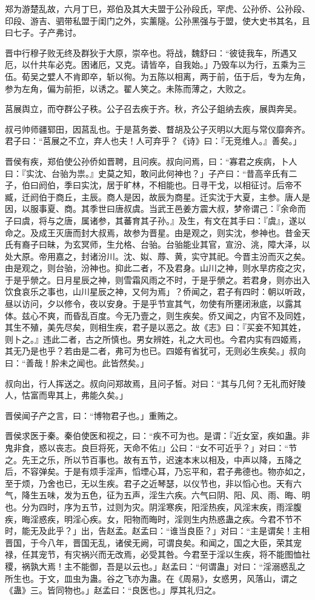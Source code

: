 \documentclass[]{article}
\begin{document}
郑为游楚乱故，六月丁巳，郑伯及其大夫盟于公孙段氏，罕虎、公孙侨、公孙段、印段、游吉、驷带私盟于闺门之外，实薰隧。公孙黑强与于盟，使大史书其名，且曰七子。子产弗讨。

晋中行穆子败无终及群狄于大原，崇卒也。将战，魏舒曰：``彼徒我车，所遇又厄，以什共车必克。困诸厄，又克。请皆卒，自我始。」乃毁车以为行，五乘为三伍。荀吴之嬖人不肯即卒，斩以徇。为五陈以相离，两于前，伍于后，专为左角，参为左角，偏为前拒，以诱之。翟人笑之。未陈而薄之，大败之。

莒展舆立，而夺群公子秩。公子召去疾于齐。秋，齐公子鉏纳去疾，展舆奔吴。

叔弓帅师疆郓田，因莒乱也。于是莒务娄、瞀胡及公子灭明以大厖与常仪靡奔齐。君子曰：``莒展之不立，弃人也夫！人可弃乎？《诗》曰：『无竞维人。』善矣。」

晋侯有疾，郑伯使公孙侨如晋聘，且问疾。叔向问焉，曰：``寡君之疾病，卜人曰：『实沈、台骀为祟。』史莫之知，敢问此何神也？」子产曰：``昔高辛氏有二子，伯曰阏伯，季曰实沈，居于旷林，不相能也。日寻干戈，以相征讨。后帝不臧，迁阏伯于商丘，主辰。商人是因，故辰为商星。迁实沈于大夏，主参。唐人是因，以服事夏、商。其季世曰唐叔虞。当武王邑姜方震大叔，梦帝谓己：『余命而子曰虞，将与之唐，属诸参，其蕃育其子孙。』及生，有文在其手曰：『虞』，遂以命之。及成王灭唐而封大叔焉，故参为晋星。由是观之，则实沈，参神也。昔金天氏有裔子曰昧，为玄冥师，生允格、台骀。台骀能业其官，宣汾、洮，障大泽，以处大原。帝用嘉之，封诸汾川。沈、姒、蓐、黄，实守其祀。今晋主汾而灭之矣。由是观之，则台骀，汾神也。抑此二者，不及君身。山川之神，则水旱疠疫之灾，于是乎禜之。日月星辰之神，则雪霜风雨之不时，于是乎禜之。若君身，则亦出入饮食哀乐之事也，山川星辰之神，又何为焉」？侨闻之，君子有四时：朝以听政，昼以访问，夕以修令，夜以安身。于是乎节宣其气，勿使有所壅闭湫底，以露其体。兹心不爽，而昏乱百度。今无乃壹之，则生疾矣。侨又闻之，内官不及同姓，其生不殖，美先尽矣，则相生疾，君子是以恶之。故《志》曰：『买妾不知其姓，则卜之。』违此二者，古之所慎也。男女辨姓，礼之大司也。今君内实有四姬焉，其无乃是也乎？若由是二者，弗可为也已。四姬有省犹可，无则必生疾矣。」叔向曰：``善哉！肸未之闻也。此皆然矣。」

叔向出，行人挥送之。叔向问郑故焉，且问子皙。对曰：``其与几何？无礼而好陵人，怙富而卑其上，弗能久矣。」

晋侯闻子产之言，曰：``博物君子也。」重贿之。

晋侯求医于秦。秦伯使医和视之，曰：``疾不可为也。是谓：『近女室，疾如蛊。非鬼非食，惑以丧志。良巨将死，天命不佑』」公曰：``女不可近乎？」对曰：``节之。先王之乐，所以节百事也。故有五节，迟速本末以相及，中声以降，五降之后，不容弹矣。于是有烦手淫声，慆堙心耳，乃忘平和，君子弗德也。物亦如之，至于烦，乃舍也已，无以生疾。君子之近琴瑟，以仪节也，非以慆心也。天有六气，降生五味，发为五色，征为五声，淫生六疾。六气曰阴、阳、风、雨、晦、明也。分为四时，序为五节，过则为灾。阴淫寒疾，阳淫热疾，风淫末疾，雨淫腹疾，晦淫惑疾，明淫心疾。女，阳物而晦时，淫则生内热惑蛊之疾。今君不节不时，能无及此乎？」出，告赵孟。赵孟曰：``谁当良臣？」对曰：``主是谓矣！主相晋国，于今八年，晋国无乱，诸侯无阙，可谓良矣。和闻之，国之大臣，荣其宠禄，任其宠节，有灾祸兴而无改焉，必受其咎。今君至于淫以生疾，将不能图恤社稷，祸孰大焉！主不能御，吾是以云也。」赵孟曰：``何谓蛊」对曰：``淫溺惑乱之所生也。于文，皿虫为蛊。谷之飞亦为蛊。在《周易》，女惑男，风落山，谓之《蛊》三。皆同物也。」赵孟曰：``良医也。」厚其礼归之。
\end{document}
